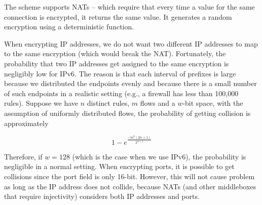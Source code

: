 The scheme supports NATs -- which require that every time a value for the same connection is encrypted, it returns the same value. It generates a random encryption using a deterministic function. 

When encrypting IP addresses, we do not want two different IP addresses to map to the same encryption (which would break the NAT). Fortunately, the probability that two IP addresses get assigned to the same encryption is negligibly low for IPv6.  The reason is that each interval of prefixes is large because we distributed the endpoints evenly and because there is a small number of such endpoints in a realistic setting (e.g., a firewall has less than 100,000 rules). Suppose we have $n$ distinct rules, $m$ flows and a $w$-bit space, with the assumption of uniformly distributed flows, the probability of getting collision is approximately 

\begin{equation}
1 - e^\frac{-m^2 (2n+1)}{2^{w+1}}
\end{equation}


Therefore, if $w=128$ (which is the case when we use IPv6), the probability is negligible in a normal setting. When encrypting ports, it is possible to get collisions since the port field is only 16-bit. However, this will not cause problem as long as the IP address does not collide, because NATs (and other middleboxes that require injectivity) considers both IP addresses and ports.








